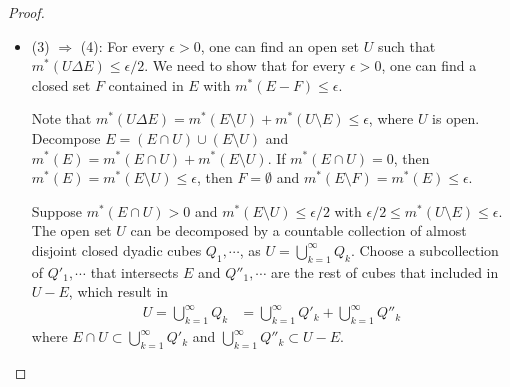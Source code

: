 \documentclass[11pt]{article}
\begin{document}
\begin{itemize}
\begin{proof}
\begin{itemize}
Note that $U\supset E$, so $E  \setminus  U = \emptyset$ and since $E  \setminus  U$ and $U  \setminus  E$ are disjoint, $m^{*}(U\Delta E)= m^{*}((U  \setminus  E)\cup (U  \setminus  V) )= m^{*}(E  \setminus  U)+ m^{*}(U  \setminus  E) = m^{*}(U  \setminus  E)\le \epsilon$, which completes the proof. 

\item (3) $\Rightarrow$ (4): For every $\epsilon>0$, one can find an open set $U$ such that  $m^{*}(U\Delta E)\le \epsilon/2 $. We need to show that for every $\epsilon>0$, one can find a closed set $F$ contained in $E$ with $m^{*}(E-F)\le \epsilon $. 

Note that $m^{*}(U\Delta E)= m^{*}(E \setminus  U)+ m^{*}(U  \setminus  E) \le \epsilon$, where $U$ is open. Decompose $E = (E\cap U)\cup (E  \setminus  U)$ and $m^{*}(E) = m^{*}(E\cap U) + m^{*}(E  \setminus  U)$. If $m^{*}(E\cap U)=0$, then $m^{*}(E) = m^{*}(E  \setminus  U)\le \epsilon$,  then $F=\emptyset$ and $m^{*}(E \setminus  F)= m^{*}(E)\le \epsilon$.

Suppose $m^{*}(E\cap U)>0$ and $m^{*}(E  \setminus  U) \le \epsilon/2$ with $\epsilon/2\le m^{*}(U \setminus  E) \le \epsilon$. The open set $U$ can be decomposed by a countable collection of almost disjoint closed dyadic cubes $Q_{1},\cdots$, as $U = \bigcup_{k=1}^{\infty}Q_{k}$. Choose a subcollection of $Q'_{1}, \cdots$ that intersects $E$ and $Q''_{1},\cdots$ are the rest of cubes that included in $U-E$, which result in
\begin{align*}
U = \bigcup_{k=1}^{\infty}Q_{k} &= \bigcup_{k=1}^{\infty}Q'_{k} + \bigcup_{k=1}^{\infty}Q''_{k}
\end{align*}
where $E\cap U\subset \bigcup_{k=1}^{\infty}Q'_{k}$ and $\bigcup_{k=1}^{\infty}Q''_{k}\subset U-E$.%


\end{itemize}
\end{proof}
\end{itemize}
\end{document}
